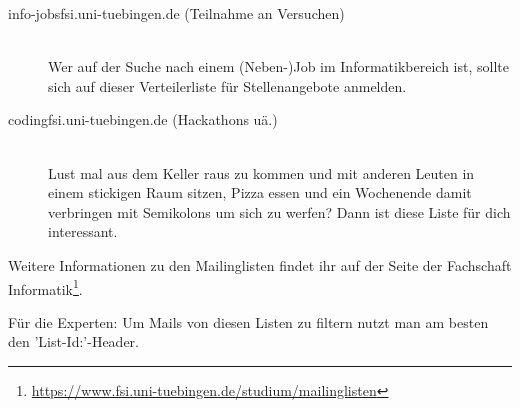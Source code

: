 \begin{description}
  \item[info-jobs\At fsi.uni-tuebingen.de (Teilnahme an Versuchen)] ~\\
Wer auf der Suche nach einem (Neben-)Job im Informatikbereich ist, sollte sich auf dieser Verteilerliste für Stellenangebote anmelden.
  
  \item[coding\At fsi.uni-tuebingen.de (Hackathons uä.)] ~\\
  Lust mal aus dem Keller raus zu kommen und mit anderen Leuten in einem stickigen Raum sitzen, Pizza essen und ein Wochenende damit verbringen mit Semikolons um sich zu werfen? Dann ist diese Liste für dich interessant.
  
  

\end{description}

Weitere Informationen zu den Mailinglisten findet ihr auf der Seite der Fachschaft Informatik\footnote{\url{https://www.fsi.uni-tuebingen.de/studium/mailinglisten}}.

Für die Experten: Um Mails von diesen Listen zu filtern nutzt man am besten den 'List-Id:'-Header.

\vfill
